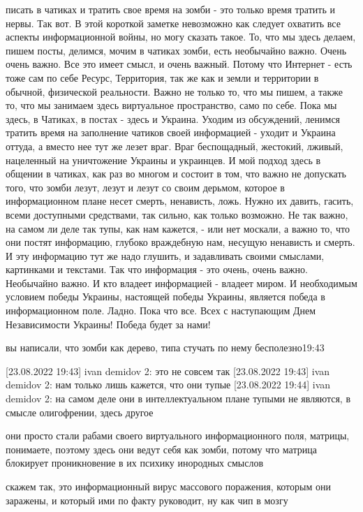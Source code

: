 писать в чатиках и тратить свое время на зомби - это только время тратить и
нервы. Так вот. В этой короткой заметке невозможно как следует охватить все
аспекты информационной войны, но могу сказать такое. То, что мы здесь делаем,
пишем посты, делимся, мочим в чатиках зомби, есть необычайно важно. Очень очень
важно. Все это имеет смысл, и очень важный. Потому что Интернет - есть тоже сам
по себе Ресурс, Территория, так же как и земли и территории в обычной,
физической реальности. Важно не только то, что мы пишем, а также то, что мы
занимаем здесь виртуальное пространство, само по себе. Пока мы здесь, в
Чатиках, в постах - здесь и Украина. Уходим из обсуждений, ленимся тратить
время на заполнение чатиков своей информацией - уходит и Украина оттуда, а
вместо нее тут же лезет враг. Враг беспощадный, жестокий, лживый, нацеленный на
уничтожение Украины и украинцев. И мой подход здесь в общении в чатиках, как
раз во многом и состоит в том, что важно не допускать того, что зомби лезут,
лезут и лезут со своим дерьмом, которое в информационном плане несет смерть,
ненависть, ложь. Нужно их давить, гасить, всеми доступными средствами, так
сильно, как только возможно. Не так важно, на самом ли деле так тупы, как нам
кажется, - или нет москали, а важно то, что они постят информацию, глубоко
враждебную нам, несущую ненависть и смерть. И эту информацию тут же надо
глушить, и задавливать своими смыслами, картинками и текстами. Так что
информация - это очень, очень важно. Необычайно важно. И кто владеет
информацией - владеет миром. И необходимым условием победы Украины, настоящей
победы Украины, является победа в информационном поле.  Ладно. Пока что все.
Всех с наступающим Днем Независимости Украины! Победа будет за нами!

вы написали, что зомби как дерево, типа стучать по нему бесполезно19:43

[23.08.2022 19:43] ivan demidov 2: это не совсем так
[23.08.2022 19:43] ivan demidov 2: нам только лишь кажется, что они тупые
[23.08.2022 19:44] ivan demidov 2: на самом деле они в интеллектуальном плане тупыми не являются, в смысле олигофрении, здесь другое

они просто стали рабами своего виртуального информационного поля, матрицы,
понимаете, поэтому здесь они ведут себя как зомби, потому что матрица блокирует
проникновение в их психику инородных смыслов

скажем так, это информационный вирус массового поражения, которым они заражены,
и который ими по факту руководит, ну как чип в мозгу

